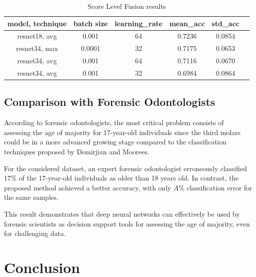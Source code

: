 \documentclass[conference]{IEEEtran}
\begin{document}
\begin{table}[t]
	\centering
	\caption{Score Level Fusion results}
	\begin{tabular}{cccccc}
		\hline
		\hline
		model, technique & batch size & learning\_rate & mean\_acc & std\_acc \\
		\hline
		resnet18, avg & 0.001 & 64 & 0.7236 & 0.0854 \\
		resnet34, max & 0.0001 & 32 & 0.7175 & 0.0653 \\
		resnet34, avg & 0.001 & 64 & 0.7116 & 0.0670 \\
		resnet34, avg & 0.001 & 32 & 0.6984 & 0.0864 \\
		\hline
		\hline
	\end{tabular}
	\label{tab:ScoreLevelFusion}
\end{table}

	


\subsection{Comparison with Forensic Odontologists}
According to forensic odontologists, the most critical problem consists of assessing the age of majority for 17-year-old individuals since the third molars could be in a more advanced growing stage compared to the classification techniques proposed by Demirjian and Moorees.

For the considered dataset, an expert forensic odontologist erroneously classified $17\%$ of the 17-year-old individuals as older than 18 years old. In contrast, the proposed method achieved a better accuracy, with only $A\%$ classification error for the same samples.

This result demonstrates that deep neural networks can effectively be used by forensic scientists as decision support tools for assessing the age of majority, even for challenging data.

\section{Conclusion}





\end{document}
